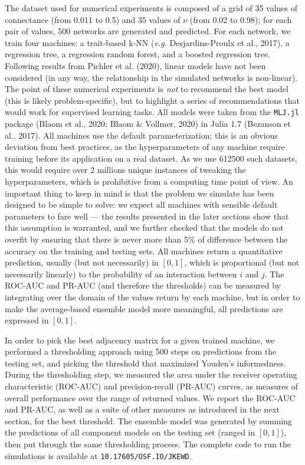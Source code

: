 \documentclass[10pt,oneside]{article}
\begin{document}
The dataset used for numerical experiments is composed of a grid of 35
values of connectance (from 0.011 to 0.5) and 35 values of \(\nu\) (from
0.02 to 0.98); for each pair of values, 500 networks are generated and
predicted. For each network, we train four machines: a trait-based k-NN
(\emph{e.g.} Desjardins-Proulx et al., 2017), a regression tree, a
regression random forest, and a boosted regression tree. Following
results from Pichler et al. (2020), linear models have not been
considered (in any way, the relationship in the simulated networks is
non-linear). The point of these numerical experiments is \emph{not} to
recommend the best model (this is likely problem-specific), but to
highlight a series of recommendations that would work for supervised
learning tasks. All models were taken from the \texttt{MLJ.jl} package
(Blaom et al., 2020; Blaom \& Vollmer, 2020) in Julia 1.7 (Bezanson et
al., 2017). All machines use the default parameterization; this is an
obvious deviation from best practices, as the hyperparameters of any
machine require training before its application on a real dataset. As we
use 612500 such datasets, this would require over 2 millions unique
instances of tweaking the hyperparameters, which is prohibitive from a
computing time point of view. An important thing to keep in mind is that
the problem we simulate has been designed to be simple to solve: we
expect all machines with sensible default parameters to fare well ---
the results presented in the later sections show that this assumption is
warranted, and we further checked that the models do not overfit by
ensuring that there is never more than 5\% of difference between the
accuracy on the training and testing sets. All machines return a
quantitative prediction, usually (but not necessarily) in \([0,1]\),
which is proportional (but not necessarily linearly) to the probability
of an interaction between \(i\) and \(j\). The ROC-AUC and PR-AUC (and
therefore the thresholds) can be measured by integrating over the domain
of the values return by each machine, but in order to make the
average-based ensemble model more meaningful, all predictions are
expressed in \([0,1]\).

In order to pick the best adjacency matrix for a given trained machine,
we performed a thresholding approach using 500 steps on predictions from
the testing set, and picking the threshold that maximized Youden's
informedness. During the thresholding step, we measured the area under
the receiver operating characteristic (ROC-AUC) and precision-recall
(PR-AUC) curves, as measures of overall performance over the range of
returned values. We report the ROC-AUC and PR-AUC, as well as a suite of
other measures as introduced in the next section, for the best
threshold. The ensemble model was generated by summing the predictions
of all component models on the testing set (ranged in \([0,1]\)), then
put through the same thresholding process. The complete code to run the
simulations is available at \texttt{10.17605/OSF.IO/JKEWD}.
\end{document}
